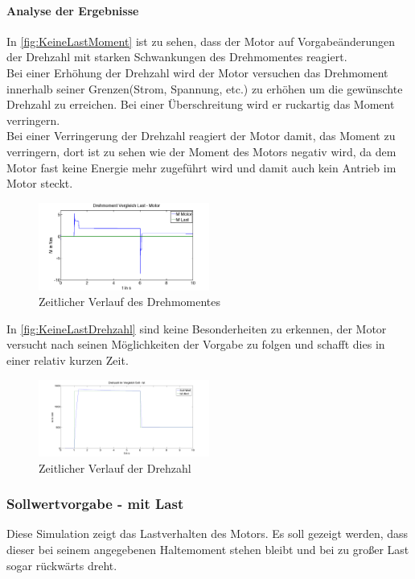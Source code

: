 \paragraph{Analyse der Ergebnisse}
	In \autoref{fig:KeineLastMoment} ist zu sehen, dass der Motor auf Vorgabeänderungen der Drehzahl mit starken Schwankungen des Drehmomentes reagiert.\\
	Bei einer Erhöhung der Drehzahl wird der Motor versuchen das Drehmoment innerhalb seiner Grenzen(Strom, Spannung, etc.) zu erhöhen um die gewünschte Drehzahl zu erreichen. Bei einer Überschreitung wird er ruckartig das Moment verringern.\\
	Bei einer Verringerung der Drehzahl reagiert der Motor damit, das Moment zu verringern, dort ist zu sehen wie der Moment des Motors negativ wird, da dem Motor fast keine Energie mehr zugeführt wird und damit auch kein Antrieb im Motor steckt.
	\begin{figure}[H]
		\includegraphics[width=0.5\textwidth]{pictures/KeineLastMoment.png}
		\caption{Zeitlicher Verlauf des Drehmomentes}
		\label{fig:KeineLastMoment}
	\end{figure}	
	In \autoref{fig:KeineLastDrehzahl} sind keine Besonderheiten zu erkennen, der Motor versucht nach seinen Möglichkeiten der Vorgabe zu folgen und schafft dies in einer relativ kurzen Zeit.
	\begin{figure}[H]
		\includegraphics[width=0.5\textwidth]{pictures/KeineLastDrehzahl.png}
		\caption{Zeitlicher Verlauf der Drehzahl}
		\label{fig:KeineLastDrehzahl}
	\end{figure}	
\subsubsection{Sollwertvorgabe - mit Last}
Diese Simulation zeigt das Lastverhalten des Motors. Es soll gezeigt werden, dass dieser bei seinem angegebenen Haltemoment stehen bleibt und bei zu großer Last sogar rückwärts dreht.
